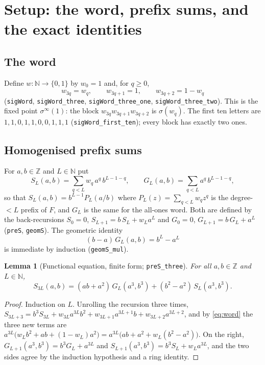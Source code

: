 \documentclass[11pt]{article}
\newtheorem{lemma}[theorem]{Lemma}
\theoremstyle{definition}
\newcommand{\N}{\mathbb{N}}
\newcommand{\Z}{\mathbb{Z}}
\newcommand{\code}[1]{\texttt{#1}}
\begin{document}
\section{Setup: the word, prefix sums, and the exact identities}
\label{sec:setup}

\subsection{The word}

Define $w\colon \N \to \{0,1\}$ by $w_0 = 1$ and, for $q \ge 0$,
\begin{equation}\label{eq:word}
w_{3q} = w_q, \qquad w_{3q+1} = 1, \qquad w_{3q+2} = 1 - w_q
\end{equation}
(\code{sigWord}, \code{sigWord\_three}, \code{sigWord\_three\_one},
\code{sigWord\_three\_two}). This is the fixed point $\sigma^\infty(1)$:
the block $w_{3q}w_{3q+1}w_{3q+2}$ is $\sigma(w_q)$. The first ten
letters are $1,1,0,1,1,0,0,1,1,1$ (\code{sigWord\_first\_ten}); every
block has exactly two ones.

\subsection{Homogenised prefix sums}

For $a, b \in \Z$ and $L \in \N$ put
\[
S_L(a,b) = \sum_{q < L} w_q\, a^q\, b^{L-1-q}, \qquad
G_L(a,b) = \sum_{q < L} a^q\, b^{L-1-q},
\]
so that $S_L(a,b) = b^{L-1} P_L(a/b)$ where $P_L(z) = \sum_{q<L} w_q
z^q$ is the degree-$<L$ prefix of $F$, and $G_L$ is the same for the
all-ones word. Both are defined by the back-recursions $S_0 = 0$,
$S_{L+1} = b\,S_L + w_L a^L$ and $G_0 = 0$, $G_{L+1} = b\,G_L + a^L$
(\code{preS}, \code{geomS}). The geometric identity
\begin{equation}\label{eq:geom}
(b-a)\,G_L(a,b) = b^L - a^L
\end{equation}
is immediate by induction (\code{geomS\_mul}).

\begin{lemma}[Functional equation, finite form; \code{preS\_three}]
\label{lem:fe}
For all $a, b \in \Z$ and $L \in \N$,
\[
S_{3L}(a,b) = (ab + a^2)\, G_L(a^3, b^3) + (b^2 - a^2)\, S_L(a^3, b^3).
\]
\end{lemma}

\begin{proof}
Induction on $L$. Unrolling the recursion three times,
$S_{3L+3} = b^3 S_{3L} + w_{3L} a^{3L} b^2 + w_{3L+1} a^{3L+1} b +
w_{3L+2} a^{3L+2}$, and by \eqref{eq:word} the three new terms are
$a^{3L}\big(w_L b^2 + ab + (1-w_L)a^2\big) = a^{3L}\big(ab + a^2 +
w_L(b^2-a^2)\big)$. On the right, $G_{L+1}(a^3,b^3) = b^3 G_L + a^{3L}$
and $S_{L+1}(a^3,b^3) = b^3 S_L + w_L a^{3L}$, and the two sides agree
by the induction hypothesis and a ring identity.
\end{proof}
\end{document}

